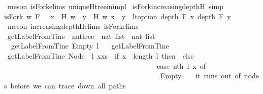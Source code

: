 \begin{isabellebody}
%
\isatagproof
{}\isamarkupfalse%
\ {\isacharparenleft}meson\ isFork{\isachardot}elims{\isacharparenleft}{}{\isacharparenright}\ uniqueH{\isacharunderscore}tree{\isacharunderscore}in{\isacharunderscore}imp{\isacharunderscore}l{\isacharparenright}%
\endisatagproof
{\isafoldproof}%
%
\isadelimproof
\isanewline
%
\endisadelimproof
\isanewline
{}\isamarkupfalse%
\ isFork{\isacharunderscore}increasing{\isacharunderscore}depth{\isacharunderscore}H\ {\isacharbrackleft}simp{\isacharbrackright}\ {\isacharcolon}\ \isanewline
{\isachardoublequoteopen}isFork\ w\ F\ {\isasymlongrightarrow}\ {\isacharparenleft}{\isasymforall}\ x\ {\isasymin}\ H\ w{\isachardot}\ {\isasymforall}\ y\ {\isasymin}\ H\ w{\isachardot}\ x\ {\isacharless}\ y\ {\isasymlongrightarrow}\ lt{\isacharunderscore}option\ {\isacharparenleft}depth\ F\ x{\isacharparenright}\ {\isacharparenleft}depth\ F\ y{\isacharparenright}{\isacharparenright}{\isachardoublequoteclose}\isanewline
%
\isadelimproof
\ \ %
\endisadelimproof
%
\isatagproof
{}\isamarkupfalse%
\ {\isacharparenleft}meson\ increasing{\isacharunderscore}depth{\isacharunderscore}H{\isachardot}elims{\isacharparenleft}{}{\isacharparenright}\ isFork{\isachardot}elims{\isacharparenleft}{}{\isacharparenright}{\isacharparenright}%
\endisatagproof
{\isafoldproof}%
%
\isadelimproof
\ \ \isanewline
%
\endisadelimproof
\ \ \isanewline
{}\isamarkupfalse%
\ getLabelFromTine\ {\isacharcolon}{\isacharcolon}\ {\isachardoublequoteopen}nattree\ {\isasymRightarrow}\ nat\ list\ {\isasymRightarrow}\ nat\ list{\isachardoublequoteclose}\ \ \isanewline
\ \ {\isachardoublequoteopen}getLabelFromTine\ Empty\ l\ {\isacharequal}\ {\isacharbrackleft}{\isacharbrackright}{\isachardoublequoteclose}\isanewline
{\isacharbar}\ {\isachardoublequoteopen}getLabelFromTine\ {\isacharunderscore}\ {\isacharbrackleft}{\isacharbrackright}\ {\isacharequal}\ {\isacharbrackleft}{\isacharbrackright}{\isachardoublequoteclose}\isanewline
{\isacharbar}\ {\isachardoublequoteopen}getLabelFromTine\ {\isacharparenleft}Node\ {\isacharunderscore}\ l{\isacharparenright}\ {\isacharparenleft}x{\isacharhash}xs{\isacharparenright}\ {\isacharequal}\ {\isacharparenleft}if\ x\ {\isasymge}\ length\ l\ then\ {\isacharbrackleft}{\isacharbrackright}\ else\ \isanewline
\ \ \ \ \ \ \ \ \ \ \ \ \ \ \ \ \ \ \ \ \ \ \ \ \ \ \ \ \ \ \ \ \ \ \ \ \ \ \ \ \ \ \ {\isacharparenleft}case\ nth\ l\ x\ of\ \isanewline
\ \ \ \ \ \ \ \ \ \ \ \ \ \ \ \ \ \ \ \ \ \ \ \ \ \ \ \ \ \ \ \ \ \ \ \ \ \ \ \ \ \ \ \ Empty\ {\isasymRightarrow}\ {\isacharbrackleft}{\isacharbrackright}\ {\isacharbar}\ {\isacharparenleft}{\isacharasterisk}it\ runs\ out\ of\ nodes\ before\ we\ can\ trace\ down\ all\ paths{\isacharasterisk}{\isacharparenright}\isanewline

\end{isabellebody}
